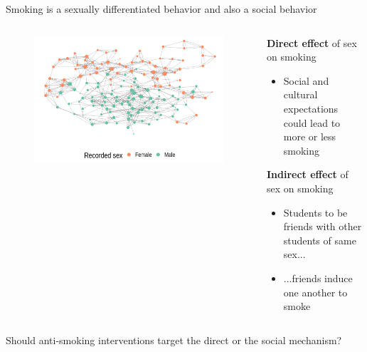 \documentclass[aspectratio=169]{beamer}
\theoremstyle{remark}
\begin{document}
\begin{frame}{Smoking is a sexually differentiated behavior and also a social behavior}
    \begin{columns}
        \centering
        \begin{column}{0.55\textwidth}
            \begin{figure}
                \centering
                \includegraphics[width=1.05\textwidth]{figures/glasgow/sex.png}
            \end{figure}
        \end{column}
        \begin{column}{0.5\textwidth}
            \textbf{Direct effect} of sex on smoking
            \begin{itemize}
                \item Social and cultural expectations could lead to more or less smoking
            \end{itemize}
            \vspace{2mm}
            \textbf{Indirect effect} of sex on smoking
            \begin{itemize}
                \item Students to be friends with other students of same sex...
                \item ...friends induce one another to smoke
            \end{itemize}
        \end{column}
    \end{columns}
    \vspace{2mm}
    \pause
    \centering
    Should anti-smoking interventions target the direct or the social mechanism?
\end{frame}
\end{document}
